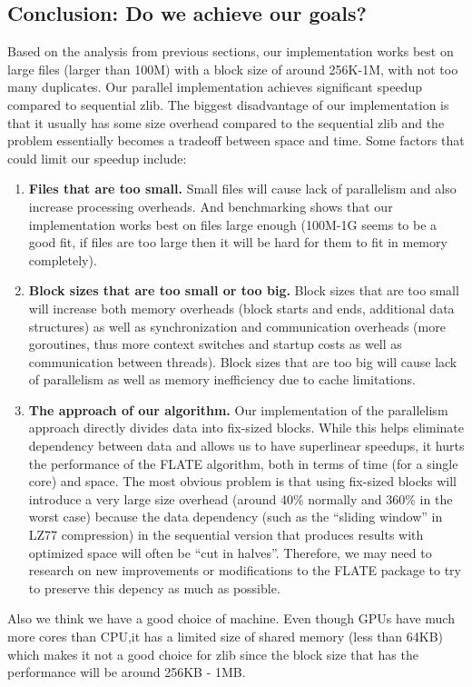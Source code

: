 \documentclass[12pt]{article}
\begin{document}
    \subsection{Conclusion: Do we achieve our goals?}
    Based on the analysis from previous sections, our implementation works best on large files (larger than 100M) with a block size of around 256K-1M, with not too many duplicates. Our parallel implementation achieves significant speedup compared to sequential zlib. The biggest disadvantage of our implementation is that it usually has some size overhead compared to the sequential zlib and the problem essentially becomes a tradeoff between space and time.
    Some factors that could limit our speedup include:
    \begin{enumerate}
        \item \textbf{Files that are too small.} Small files will cause lack of parallelism and also increase processing overheads. And benchmarking shows that our implementation works best on files large enough (100M-1G seems to be a good fit, if files are too large then it will be hard for them to fit in memory completely).
        \item \textbf{Block sizes that are too small or too big.} Block sizes that are too small will increase both memory overheads (block starts and ends, additional data structures) as well as synchronization and communication overheads (more goroutines, thus more context switches and startup costs as well as communication between threads). Block sizes that are too big will cause lack of parallelism as well as memory inefficiency due to cache limitations.
        \item \textbf{The approach of our algorithm.} Our implementation of the parallelism approach directly divides data into fix-sized blocks. While this helps eliminate dependency between data and allows us to have superlinear speedups, it hurts the performance of the FLATE algorithm, both in terms of time (for a single core) and space. The most obvious problem is that using fix-sized blocks will introduce a very large size overhead (around 40\% normally and 360\% in the worst case) because the data dependency (such as the ``sliding window'' in LZ77 compression) in the sequential version that produces results with optimized space will often be ``cut in halves''. Therefore, we may need to research on new improvements or modifications to the FLATE package to try to preserve this depency as much as possible.
    \end{enumerate}
    Also we think we have a good choice of machine. Even though GPUs have much more cores than CPU,it has a limited size of shared memory (less than 64KB) which makes it not a good choice for zlib since the block size that has the performance will be around 256KB - 1MB.\\
\end{document}
